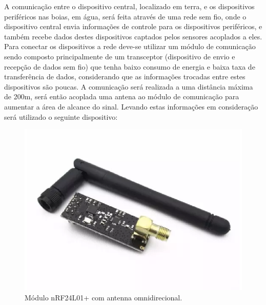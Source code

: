 A comunicação entre o dispositivo central, localizado em terra, e os dispositivos periféricos nas boias, em água, será feita através de uma rede sem fio, onde o dispositivo central envia informações de controle para os dispositivos periféricos, e também recebe dados destes dispositivos captados pelos sensores acoplados a eles. Para conectar os dispositivos a rede deve-se utilizar um módulo de comunicação sendo composto principalmente de um transceptor (dispositivo de envio e recepção de dados sem fio) que tenha baixo consumo de energia e baixa taxa de transferência de dados, considerando que as informações trocadas entre estes dispositivos são poucas. A comunicação será realizada a uma distância máxima de 200m, será então acoplada uma antena ao módulo de comunicação para aumentar a área de alcance do sinal. Levando estas informações em consideração será utilizado o seguinte dispositivo:


\begin{figure}[H]
 \centering
   \includegraphics[keepaspectratio=true,scale=0.8]{figuras/modulonrf2.eps}
 \caption{Módulo nRF24L01+ com antenna omnidirecional.}
 \label{nRF24}
\end{figure}

